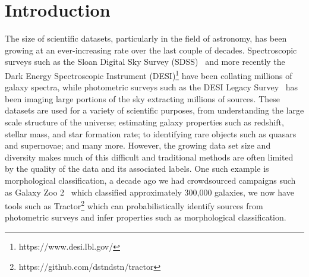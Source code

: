 
\section{Introduction}\label{sec:introduction}
The size of scientific datasets, particularly in the field of astronomy, has been growing at an ever-increasing rate
over the last couple of decades.
Spectroscopic surveys such as the Sloan Digital Sky Survey (SDSS)~\citep{york2000} and more recently the Dark Energy
Spectroscopic Instrument (DESI)\footnote{https://www.desi.lbl.gov/} have been collating millions of galaxy spectra, while photometric
surveys such as the DESI Legacy Survey~\citep{desilegacy2018} has been imaging large portions of the sky extracting millions
of sources.
These datasets are used for a variety of scientific purposes, from understanding the large scale structure of the universe;
estimating galaxy properties such as redshift, stellar mass, and star formation rate; to identifying rare objects such as
quasars and supernovae; and many more.
However, the growing data set size and diversity makes much of this difficult and traditional methods are often
limited by the quality of the data and its associated labels.
One such example is morphological classification, a decade ago we had crowdsourced campaigns such as Galaxy Zoo 2~\citep{willet2013}
which classified approximately 300,000 galaxies, we now have tools such as Tractor\footnote{https://github.com/dstndstn/tractor}
which can probabilistically identify sources from photometric surveys and infer properties such as morphological classification.

